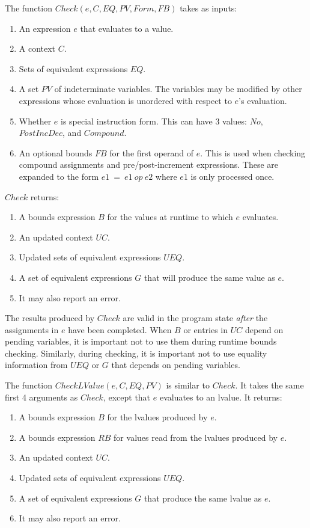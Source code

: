 The function $Check(e, C, EQ, PV, Form, FB)$ takes as inputs:
\begin{enumerate}
\item An expression $e$ that evaluates to a value.
\item A context $C$.
\item Sets of equivalent expressions $EQ$.
\item A set $PV$ of indeterminate variables.  The variables 
may be modified by other expressions whose  evaluation is unordered with respect to $e$'s evaluation.
\item Whether $e$ is special instruction form.  This can have 3 values: $No$, $PostIncDec$,
and $Compound$.
\item An optional bounds $FB$ for the first operand of $e$.  
This is used when checking compound assignments and pre/post-increment expressions.  These are
expanded to the form $e1~=~e1~op~e2$ where $e1$ is only processed once. 
\end{enumerate}

$Check$ returns:
\begin{enumerate}
\item A bounds expression $B$ for the values at runtime to which $e$ evaluates.
\item An updated context $\mathit{UC}$.
\item Updated sets of equivalent expressions $UEQ$.
\item A set of equivalent expressions $G$ that will produce the same value as $e$. 
\item It may also report an error.
\end{enumerate}
The results produced by $Check$ are valid in the program state
{\em after} the assignments in $e$ have been completed.   When $B$ or entries in 
$\mathit{UC}$ depend on pending variables, it is important not to use them during runtime bounds checking.
Similarly, during checking, it is important not to use equality information
from $UEQ$ or $G$ that depends on pending variables.

The function $CheckLValue(e, C, EQ, PV)$ is similar to $Check$.  It takes the
same first 4 arguments as $Check$, except that $e$ evaluates to an lvalue.
It returns:
\begin{enumerate}
\item A bounds expression $B$ for the lvalues produced by $e$.
\item A bounds expression $RB$ for values read from the lvalues produced by $e$.
\item An updated context $\mathit{UC}$.
\item Updated sets of equivalent expressions $UEQ$.
\item A set of equivalent expressions $G$ that produce the same lvalue as $e$.
\item It may also report an error.
\end{enumerate}

